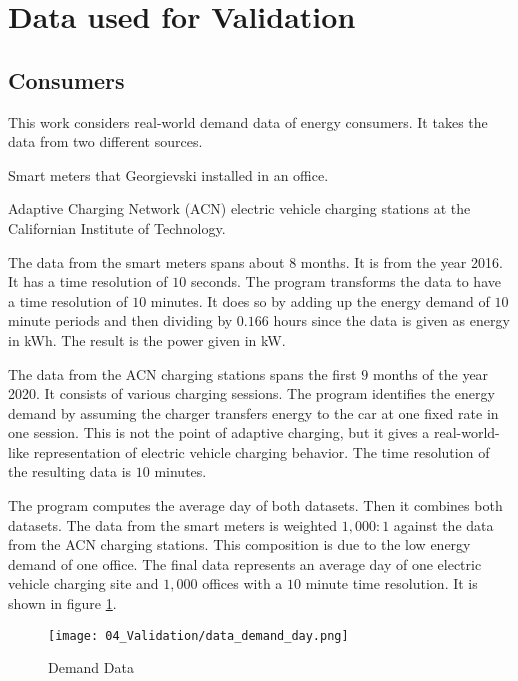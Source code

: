 \section{Data used for Validation}
\label{validation:data}

\subsection{Consumers}

This work considers real-world demand data of energy consumers.
It takes the data from two different sources.
\begin{enumerate*}[label=(\roman*)]
  \item Smart meters that Georgievski \citeauthor{Georgievski2012} installed in an office. \cite{Georgievski2012}
  \item Adaptive Charging Network (ACN) electric vehicle charging stations at the Californian Institute of Technology. \cite{Lee2019, ACNCaltech2020}
\end{enumerate*}

The data from the smart meters spans about $8$ months.
It is from the year 2016.
It has a time resolution of $10$ seconds.
The program transforms the data to have a time resolution of $10$ minutes.
It does so by adding up the energy demand of $10$ minute periods and then dividing by $0.166$ hours since the data is given as energy in kWh.
The result is the power given in kW.

The data from the ACN charging stations spans the first $9$ months of the year 2020.
It consists of various charging sessions.
The program identifies the energy demand by assuming the charger transfers energy to the car at one fixed rate in one session.
This is not the point of adaptive charging, but it gives a real-world-like representation of electric vehicle charging behavior.
The time resolution of the resulting data is $10$ minutes.

The program computes the average day of both datasets.
Then it combines both datasets.
The data from the smart meters is weighted $1, 000 : 1$ against the data from the ACN charging stations.
This composition is due to the low energy demand of one office.
The final data represents an average day of one electric vehicle charging site and $1, 000$ offices with a $10$ minute time resolution.
It is shown in figure \ref{figure:data.demand.day}.

\begin{figure}
  \centering
  \texttt{[image: 04\_Validation/data\_demand\_day.png]}
  \caption{Demand Data}
  \label{figure:data.demand.day}
\end{figure}

